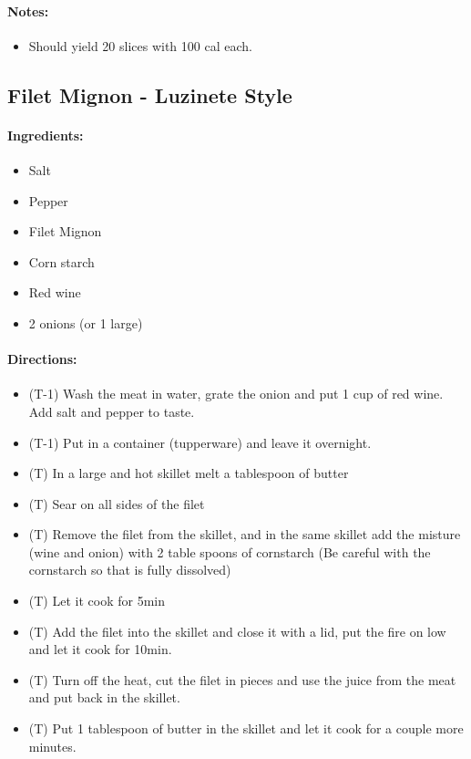 \documentclass{article}
\begin{document}
\paragraph{Notes:}
\begin{itemize}
	\item Should yield 20 slices with 100 cal each.
\end{itemize}

\subsection{Filet Mignon - Luzinete Style}

\paragraph{Ingredients:}

\begin{itemize}
	\item Salt
	\item Pepper
	\item Filet Mignon
	\item Corn starch
	\item Red wine
	\item 2 onions (or 1 large)
\end{itemize}

\paragraph{Directions:}
\begin{itemize}
	\item (T-1) Wash the meat in water, grate the onion and put 1 cup of red wine. Add salt and pepper to taste.
	\item (T-1) Put in a container (tupperware) and leave it overnight.
	\item (T) In a large and hot skillet melt a tablespoon of butter
	\item (T) Sear on all sides of the filet
	\item (T) Remove the filet from the skillet, and in the same skillet add the misture (wine and onion) with 2 table spoons of cornstarch (Be careful with the cornstarch so that is fully dissolved)
	\item (T) Let it cook for 5min
	\item (T) Add the filet into the skillet and close it with a lid, put the fire on low and let it cook for 10min.
	\item (T) Turn off the heat, cut the filet in pieces and use the juice from the meat and put back in the skillet. 
	\item (T) Put 1 tablespoon of butter in the skillet and let it cook for a couple more minutes.
\end{itemize}
\end{document}

